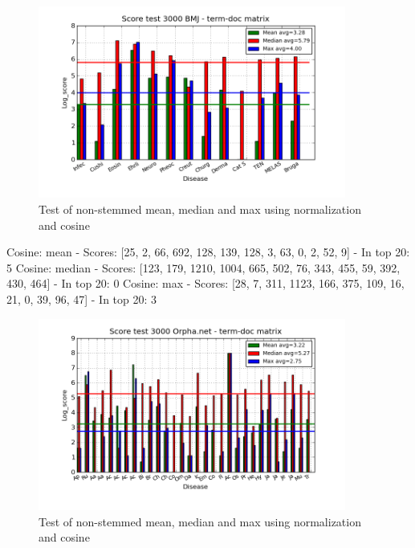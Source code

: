 \begin{figure}[h!]
        \begin{center}
          \includegraphics[width=0.9\textwidth]{barcharts/termDoc_bmj_hist_3000_ns_mea_med_max_nc.png}
        \end{center}
        \caption{Test of non-stemmed mean, median and max using normalization and cosine}
        \label{termDoc_bmj_hist_3000_ns_mea_med_max_nc}
\end{figure}

 
Cosine: mean - Scores: [25, 2, 66, 692, 128, 139, 128, 3, 63, 0, 2, 52, 9] - In top 20: 5
Cosine: median - Scores: [123, 179, 1210, 1004, 665, 502, 76, 343, 455, 59, 392, 430, 464] - In top 20: 0
Cosine: max - Scores: [28, 7, 311, 1123, 166, 375, 109, 16, 21, 0, 39, 96, 47] - In top 20: 3


\begin{figure}[h!]
        \begin{center}
          \includegraphics[width=0.9\textwidth]{barcharts/termDoc_orphan_hist_3000_ns_mea_med_max_nc.png}
        \end{center}
        \caption{Test of non-stemmed mean, median and max using normalization and cosine}
        \label{termDoc_orphan_hist_3000_ns_mea_med_max_nc}
\end{figure}
 
